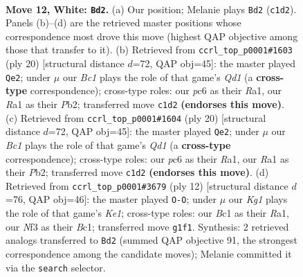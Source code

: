 \documentclass[11pt]{article}
\begin{document}
\clearpage

\begin{figure}[p]\centering
\begin{subfigure}{0.46\textwidth}\centering
\resizebox{\linewidth}{!}{%
\newchessgame
\chessboard[
  setfen={rnb1r1k1/pp1q2pp/2p1pn2/5p2/1bPP4/2N1PNP1/P4PBP/R1BQR1K1 w - - 1 12},
  showmover=false,
  pgfstyle=straightmove, color=movearrow, markmove={c1-d2}
]}
\caption{}
\end{subfigure}\hfill
\begin{subfigure}{0.46\textwidth}\centering
\resizebox{\linewidth}{!}{%
\newchessgame
\chessboard[
  setfen={rnq1k2r/pp2ppbp/2pn2p1/8/P1pPP1b1/2N1BNP1/1P3PBP/R2Q1RK1 w kq - 5 11},
  showmover=false,
  pgfstyle=straightmove, color=movearrow, markmove={d1-e2}
]}
\caption{}
\end{subfigure}
\\[4pt]
\begin{subfigure}{0.46\textwidth}\centering
\resizebox{\linewidth}{!}{%
\newchessgame
\chessboard[
  setfen={rnq1k2r/pp2ppbp/2pn2p1/8/P1pPP1b1/2N1BNP1/1P3PBP/R2Q1RK1 w kq - 3 11},
  showmover=false,
  pgfstyle=straightmove, color=movearrow, markmove={d1-e2}
]}
\caption{}
\end{subfigure}\hfill
\begin{subfigure}{0.46\textwidth}\centering
\resizebox{\linewidth}{!}{%
\newchessgame
\chessboard[
  setfen={r1bq1rk1/ppp2ppp/2np1n2/4p3/1b2P3/2NP1NP1/PPP2PBP/R1BQK2R w KQ - 1 7},
  showmover=false,
  pgfstyle=straightmove, color=movearrow, markmove={e1-g1}
]}
\caption{}
\end{subfigure}
\caption{\textbf{Move 12, White: \texttt{Bd2}.} (a) Our position; Melanie plays \texttt{Bd2} (\texttt{c1d2}). Panels (b)--(d) are the retrieved master positions whose correspondence most drove this move (highest QAP objective among those that transfer to it). (b) Retrieved from \texttt{ccrl\_top\_p0001\#1603} (ply 20) [structural distance $d$=72, QAP obj=45]: the master played \texttt{Qe2}; under $\mu$ our \emph{Bc1} plays the role of that game's \emph{Qd1} (a \textbf{cross-type} correspondence); cross-type roles: our \emph{p}c6 as their \emph{R}a1, our \emph{R}a1 as their \emph{P}b2; transferred move \texttt{c1d2} \textbf{(endorses this move)}. (c) Retrieved from \texttt{ccrl\_top\_p0001\#1604} (ply 20) [structural distance $d$=72, QAP obj=45]: the master played \texttt{Qe2}; under $\mu$ our \emph{Bc1} plays the role of that game's \emph{Qd1} (a \textbf{cross-type} correspondence); cross-type roles: our \emph{p}c6 as their \emph{R}a1, our \emph{R}a1 as their \emph{P}b2; transferred move \texttt{c1d2} \textbf{(endorses this move)}. (d) Retrieved from \texttt{ccrl\_top\_p0001\#3679} (ply 12) [structural distance $d$=76, QAP obj=46]: the master played \texttt{O-O}; under $\mu$ our \emph{Kg1} plays the role of that game's \emph{Ke1}; cross-type roles: our \emph{B}c1 as their \emph{R}a1, our \emph{N}f3 as their \emph{B}c1; transferred move \texttt{g1f1}. Synthesis: 2 retrieved analogs transferred to \texttt{Bd2} (summed QAP objective 91, the strongest correspondence among the candidate moves); Melanie committed it via the \texttt{search} selector.}
\label{fig:thought-m22}
\end{figure}
\end{document}
